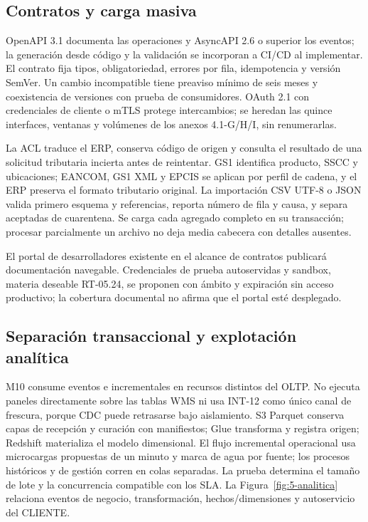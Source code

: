 \subsection{Contratos y carga masiva}
OpenAPI 3.1 documenta las operaciones y AsyncAPI 2.6 o superior los eventos; la generación desde código y la validación se incorporan a CI/CD al implementar. El contrato fija tipos, obligatoriedad, errores por fila, idempotencia y versión SemVer. Un cambio incompatible tiene preaviso mínimo de seis meses y coexistencia de versiones con prueba de consumidores. OAuth 2.1 con credenciales de cliente o mTLS protege intercambios; se heredan las quince interfaces, ventanas y volúmenes de los anexos 4.1-G/H/I, sin renumerarlas.

La ACL traduce el ERP, conserva código de origen y consulta el resultado de una solicitud tributaria incierta antes de reintentar. GS1 identifica producto, SSCC y ubicaciones; EANCOM, GS1 XML y EPCIS se aplican por perfil de cadena, y el ERP preserva el formato tributario original. La importación CSV UTF-8 o JSON valida primero esquema y referencias, reporta número de fila y causa, y separa aceptadas de cuarentena. Se carga cada agregado completo en su transacción; procesar parcialmente un archivo no deja media cabecera con detalles ausentes.

El portal de desarrolladores existente en el alcance de contratos publicará documentación navegable. Credenciales de prueba autoservidas y sandbox, materia deseable RT-05.24, se proponen con ámbito y expiración sin acceso productivo; la cobertura documental no afirma que el portal esté desplegado.

\subsection{Separación transaccional y explotación analítica}
M10 consume eventos e incrementales en recursos distintos del OLTP. No ejecuta paneles directamente sobre las tablas WMS ni usa INT-12 como único canal de frescura, porque CDC puede retrasarse bajo aislamiento. S3 Parquet conserva capas de recepción y curación con manifiestos; Glue transforma y registra origen; Redshift materializa el modelo dimensional. El flujo incremental operacional usa microcargas propuestas de un minuto y marca de agua por fuente; los procesos históricos y de gestión corren en colas separadas. La prueba determina el tamaño de lote y la concurrencia compatible con los SLA.
La Figura~\ref{fig:5-analitica} relaciona eventos de negocio, transformación, hechos/dimensiones y autoservicio del CLIENTE.

